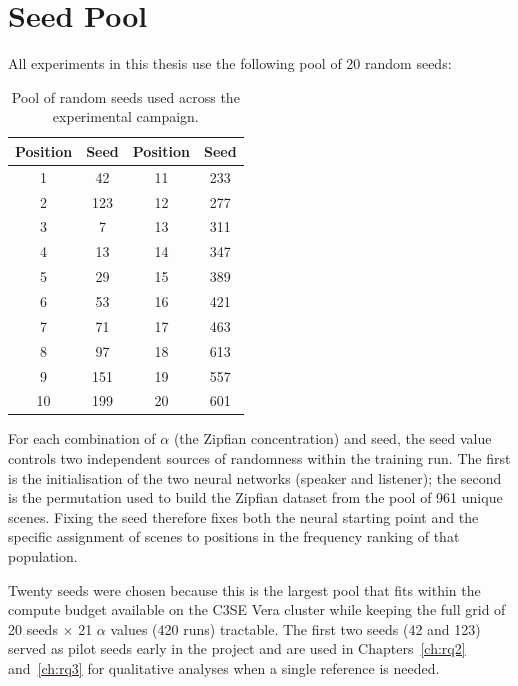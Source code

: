 \chapter{Seed Pool}\label{ch:apda}


All experiments in this thesis use the following pool of 20 random seeds:

\begin{table}[htbp]
\centering
\begin{tabular}{cc|cc}
\toprule
Position & Seed & Position & Seed \\
\midrule
1 & 42 & 11 & 233 \\
2 & 123 & 12 & 277 \\
3 & 7 & 13 & 311 \\
4 & 13 & 14 & 347 \\
5 & 29 & 15 & 389 \\
6 & 53 & 16 & 421 \\
7 & 71 & 17 & 463 \\
8 & 97 & 18 & 613 \\
9 & 151 & 19 & 557 \\
10 & 199 & 20 & 601 \\
\bottomrule
\end{tabular}
\caption{Pool of random seeds used across the experimental campaign.}
\label{tab:seed-pool}
\end{table}

For each combination of $\alpha$ (the Zipfian concentration) and seed, the seed value controls two independent sources of randomness within the training run. The first is the initialisation of the two neural networks (speaker and listener); the second is the permutation used to build the Zipfian dataset from the pool of 961 unique scenes. Fixing the seed therefore fixes both the neural starting point and the specific assignment of scenes to positions in the frequency ranking of that population.

Twenty seeds were chosen because this is the largest pool that fits within the compute budget available on the C3SE Vera cluster while keeping the full grid of 20 seeds $\times$ 21 $\alpha$ values (420 runs) tractable. The first two seeds (42 and 123) served as pilot seeds early in the project and are used in Chapters~\ref{ch:rq2} and~\ref{ch:rq3} for qualitative analyses when a single reference is needed.